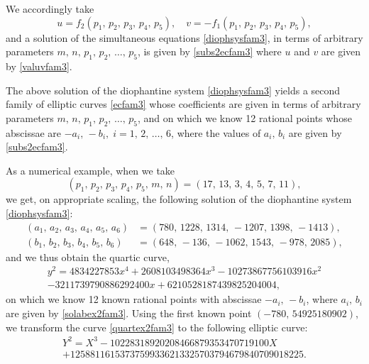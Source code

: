 \documentclass[11pt, leqno]{article}
\begin{document}
We accordingly take
\begin{equation}
u=f_2(p_1,\,p_2,\,p_3,\,p_4,\,p_5),\quad v=-f_1(p_1,\,p_2,\,p_3,\,p_4,\,p_5), \label{valuvfam3}
\end{equation}
and a solution of the simultaneous equations \eqref{diophsysfam3}, in terms of arbitrary parameters $m,\,n,\,p_1,\,p_2,\,\ldots,\,p_5$, is given by \eqref{subs2ecfam3} where $u$ and $v$ are given by \eqref{valuvfam3}.

The above solution of the diophantine system \eqref{diophsysfam3} yields  a second family of elliptic curves \eqref{ecfam3} whose coefficients 
 are given in terms of arbitrary parameters $m,\,n,\,p_1,\,p_2,\,\ldots,\,p_5$, and on which we know 12 rational points whose abscissae are $-a_i, \, -b_i,\;i=1,\,2,\,\ldots,\,6$, where the values of $a_i,\,b_i$ are given by \eqref{subs2ecfam3}.


As a numerical example, when we take  \[(p_1,\,p_2,\,p_3,\,p_4,\,p_5,\,m,\,n)=(17,\,13,\,3,\,4,\,5,\,7,\,11),\]  
we get, on appropriate scaling,  the following solution of the diophantine system \eqref{diophsysfam3}:
\begin{equation}
\begin{aligned}
(a_1,\,a_2,\,a_3,\,a_4,\,a_5,\,a_6)&=(780,\,1228,\,1314,\, -1207,\, 1398,\,-1413),\\
 (b_1,\,b_2,\,b_3,\,b_4,\,b_5,\,b_6)&=(648, \,-136,\, -1062,\,  1543,\,  -978,\,  2085),
\end{aligned}
\label{solabex2fam3}
\end{equation}
and we thus obtain the quartic curve,
\begin{multline}
y^2=4834227853x^4+2608103498364x^3-10273867756103916x^2\\
-3211739790886292400x+6210528187439825204004, \label{quartex2fam3}
\end{multline}
on which we know 12 known rational points with abscissae $-a_i,\,-b_i$, where $a_i,\,b_i$ are given by \eqref{solabex2fam3}. Using the first known point $(-780,\,54925180902)$, we transform the curve \eqref{quartex2fam3} to the following elliptic curve:
\begin{multline}
Y^2=X^3-10228318920208466879353470719100X\\
+12588116153737599336213325703794679840709018225. \label{cubicex2fam3}
\end{multline}
\end{document}
